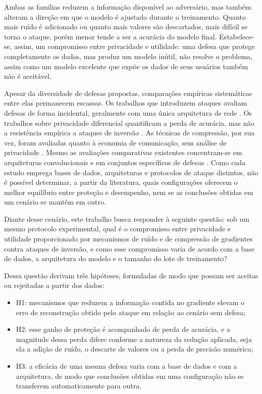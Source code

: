 Ambas as famílias reduzem a informação disponível ao adversário, mas também alteram a direção em que o modelo é ajustado durante o treinamento. Quanto mais ruído é adicionado ou quanto mais valores são descartados, mais difícil se torna o ataque, porém menor tende a ser a acurácia do modelo final. Estabelece-se, assim, um compromisso entre privacidade e utilidade: uma defesa que protege completamente os dados, mas produz um modelo inútil, não resolve o problema, assim como um modelo excelente que expõe os dados de seus usuários também não é aceitável.

Apesar da diversidade de defesas propostas, comparações empíricas sistemáticas entre elas permanecem escassas. Os trabalhos que introduzem ataques avaliam defesas de forma incidental, geralmente com uma única arquitetura de rede \cite{Zhu2019}. Os trabalhos sobre privacidade diferencial quantificam a perda de acurácia, mas não a resistência empírica a ataques de inversão \cite{Abadi2016}. As técnicas de compressão, por sua vez, foram avaliadas quanto à economia de comunicação, sem análise de privacidade \cite{Stich2018,Wangni2018,Alistarh2017,Lin2018}. Mesmo as avaliações comparativas existentes concentram-se em arquiteturas convolucionais e em conjuntos específicos de defesas \cite{Wei2020,Huang2021}. Como cada estudo emprega bases de dados, arquiteturas e protocolos de ataque distintos, não é possível determinar, a partir da literatura, quais configurações oferecem o melhor equilíbrio entre proteção e desempenho, nem se as conclusões obtidas em um cenário se mantêm em outro.

Diante desse cenário, este trabalho busca responder à seguinte questão: sob um mesmo protocolo experimental, qual é o compromisso entre privacidade e utilidade proporcionado por mecanismos de ruído e de compressão de gradientes contra ataques de inversão, e como esse compromisso varia de acordo com a base de dados, a arquitetura do modelo e o tamanho do lote de treinamento?

Dessa questão derivam três hipóteses, formuladas de modo que possam ser aceitas ou rejeitadas a partir dos dados:

\begin{itemize}
  \item H1: mecanismos que reduzem a informação contida no gradiente elevam o erro de reconstrução obtido pelo ataque em relação ao cenário sem defesa;
  \item H2: esse ganho de proteção é acompanhado de perda de acurácia, e a magnitude dessa perda difere conforme a natureza da redução aplicada, seja ela a adição de ruído, o descarte de valores ou a perda de precisão numérica;
  \item H3: a eficácia de uma mesma defesa varia com a base de dados e com a arquitetura, de modo que conclusões obtidas em uma configuração não se transferem automaticamente para outra.
\end{itemize}

